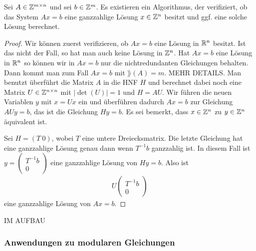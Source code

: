 	\begin{thm}
		Sei $A \in \mathbb Z^{m \times n}$ und sei $b \in \mathbb Z^m$. Es existieren ein Algorithmus, der verifiziert, ob das System $A x =b$ eine ganzzahlige Lösung $x \in \mathbb Z^n$ besitzt und ggf. eine solche Lösung berechnet. 
	\end{thm} 
	\begin{proof}
		Wir können zuerst verifizieren, ob $A x =b$ eine Lösung in $\mathbb R^n$ besitzt. Ist das nicht der Fall, so hat man auch keine Lösung in $\mathbb Z^n$. Hat $A x= b$ eine Lösung in $\mathbb R^n$ so können wir in $A x=b$ nur die nichtredundanten Gleichungen behalten. Dann kommt man zum Fall $A x =b$ mit $\rang(A) = m$. MEHR DETAILS. Man benutzt überführt die Matrix $A$ in die HNF $H$ und berechnet dabei noch eine Matrix $U \in \mathbb Z^{n \times n}$ mit $|\det(U)|=1$ und $H = A U$. Wir führen die neuen Variablen $y$ mit $x = U x$ ein und überführen dadurch $A x =b$ zur Gleichung $A U y = b$, das ist die Gleichung $H y = b$. Es sei bemerkt, dass $x \in \mathbb Z^n$ zu $y \in \mathbb Z^n$ äquivalent ist. 
		
		Sei $H  = (T \  0)$, wobei $T$ eine untere Dreiecksmatrix. Die letzte Gleichung hat eine ganzzahlige Lösung genau dann wenn $T^{-1} b$ ganzzahlig ist. In diesem Fall ist $y = \begin{pmatrix} T^{-1} b \\ 0 \end{pmatrix}$ eine ganzzahlige Lösung von $H y =b$. Also ist 
		\begin{align*}
			U \begin{pmatrix} T^{-1} b \\ 0 \end{pmatrix} 
		\end{align*}
		eine ganzzahlige Lösung von $A x= b$. 
	\end{proof} 
	
	\begin{bsp}
		IM AUFBAU 
	\end{bsp} 
	
	\subsubsection{Anwendungen zu modularen Gleichungen} 
	
